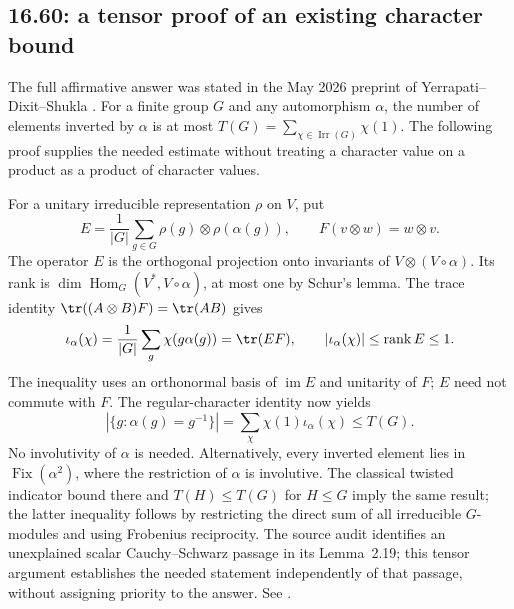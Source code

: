 \subsection{16.60: a tensor proof of an existing character bound}
\label{prior:16.60}

The full affirmative answer was stated in the May 2026
preprint of Yerrapati--Dixit--Shukla
\cite[Theorem~3.1]{yerrapati-dixit-shukla}.
For a finite group \(G\) and any automorphism \(\alpha\),
the number of elements inverted by \(\alpha\) is at most
\(T(G)=\sum_{\chi\in\operatorname{Irr}(G)}\chi(1)\).
The following proof supplies the needed estimate without
treating a character value on a product as a product of
character values.

For a unitary irreducible representation \(\rho\) on \(V\),
put
\[
 E=\frac1{|G|}\sum_{g\in G}\rho(g)\otimes\rho(\alpha(g)),
 \qquad F(v\otimes w)=w\otimes v.
\]
The operator \(E\) is the orthogonal projection onto invariants
of \(V\otimes(V\circ\alpha)\). Its rank is
\(\dim\operatorname{Hom}_G(V^*,V\circ\alpha)\), at most one
by Schur's lemma. The trace identity
\(\tr((A\otimes B)F)=\tr(AB)\) gives
\[
 \iota_\alpha(\chi)
 =\frac1{|G|}\sum_g\chi(g\alpha(g))=\tr(EF),\qquad
 |\iota_\alpha(\chi)|\le\operatorname{rank}E\le1.
\]
The inequality uses an orthonormal basis of \(\operatorname{im}E\)
and unitarity of \(F\); \(E\) need not commute with \(F\).
The regular-character identity now yields
\[
 |\{g:\alpha(g)=g^{-1}\}|
   =\sum_\chi\chi(1)\iota_\alpha(\chi)\le T(G).
\]
No involutivity of \(\alpha\) is needed.
Alternatively, every inverted element lies in
\(\operatorname{Fix}(\alpha^2)\), where the restriction of
\(\alpha\) is involutive. The classical twisted indicator
bound there and \(T(H)\le T(G)\) for \(H\le G\) imply the
same result; the latter inequality follows by restricting
the direct sum of all irreducible \(G\)-modules and using
Frobenius reciprocity.
The source audit identifies an unexplained scalar
Cauchy--Schwarz passage in its Lemma~2.19; this tensor
argument establishes the needed statement independently of
that passage, without assigning priority to the answer.
See .
